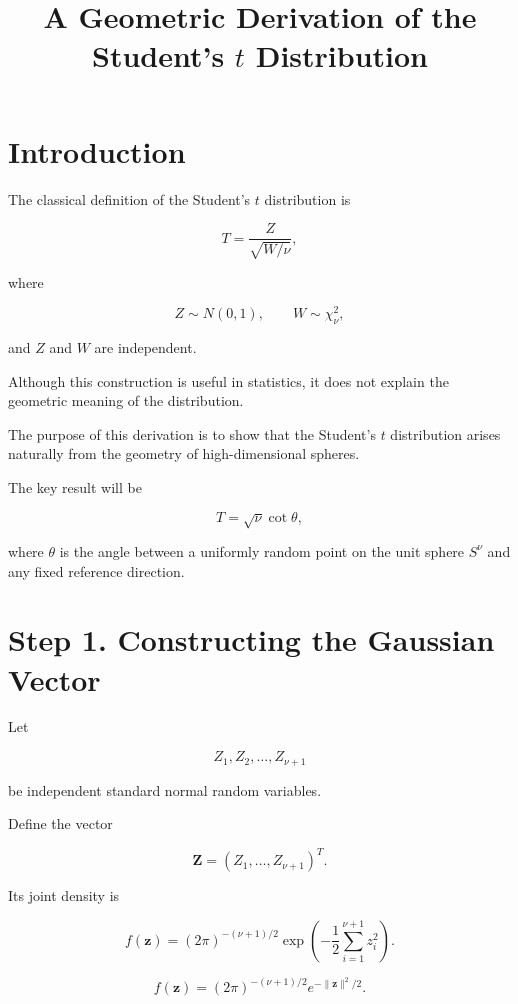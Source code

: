 \documentclass[11pt]{article}
\title{A Geometric Derivation of the Student's $t$ Distribution}
\author{}
\date{}
\begin{document}
	
	\maketitle
	\tableofcontents
	
	
	\section{Introduction}
	
	The classical definition of the Student's $t$ distribution is
	
	\[
	T=\frac{Z}{\sqrt{W/\nu}},
	\]
	
	where
	
	\[
	Z\sim N(0,1), \qquad
	W\sim\chi^2_\nu,
	\]
	
	and $Z$ and $W$ are independent.
	
	Although this construction is useful in statistics, it does not explain the
	geometric meaning of the distribution.
	
	The purpose of this derivation is to show that the Student's $t$
	distribution arises naturally from the geometry of high-dimensional
	spheres.
	
	The key result will be
	
	\[
	T
	=
	\sqrt{\nu}\cot\theta,
	\]
	
	where $\theta$ is the angle between a uniformly random point on the unit
	sphere $S^\nu$ and any fixed reference direction.
	
	
	\section{Step 1. Constructing the Gaussian Vector}
	
	Let
	
	\[
	Z_1,Z_2,\ldots,Z_{\nu+1}
	\]
	
	be independent standard normal random variables.
	
	Define the vector
	
	\[
	\mathbf Z
	=
	(Z_1,\ldots,Z_{\nu+1})^T.
	\]
	
	Its joint density is
	
	\[
	f(\mathbf z)
	=
	(2\pi)^{-(\nu+1)/2}
	\exp
	\left(
	-\frac12
	\sum_{i=1}^{\nu+1}
	z_i^2
	\right).
	\]
	
	\[
	f(\mathbf z)
	=
	(2\pi)^{-(\nu+1)/2}
	e^{-\|\mathbf z\|^2/2}.
	\]
	
\end{document}
